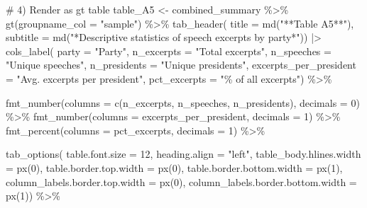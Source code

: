 \documentclass[
  man]{apa7}
\newenvironment{Shaded}{\begin{snugshade}}{\end{snugshade}}
\newcommand{\AttributeTok}[1]{\textcolor[rgb]{0.40,0.45,0.13}{#1}}
\newcommand{\CommentTok}[1]{\textcolor[rgb]{0.37,0.37,0.37}{#1}}
\newcommand{\DecValTok}[1]{\textcolor[rgb]{0.68,0.00,0.00}{#1}}
\newcommand{\FunctionTok}[1]{\textcolor[rgb]{0.28,0.35,0.67}{#1}}
\newcommand{\NormalTok}[1]{\textcolor[rgb]{0.00,0.23,0.31}{#1}}
\newcommand{\OtherTok}[1]{\textcolor[rgb]{0.00,0.23,0.31}{#1}}
\newcommand{\SpecialCharTok}[1]{\textcolor[rgb]{0.37,0.37,0.37}{#1}}
\newcommand{\StringTok}[1]{\textcolor[rgb]{0.13,0.47,0.30}{#1}}
\begin{document}
\begin{Shaded}
\begin{Highlighting}[]
\CommentTok{\# 4) Render as gt table}
\NormalTok{table\_A5 }\OtherTok{\textless{}{-}}\NormalTok{ combined\_summary }\SpecialCharTok{\%\textgreater{}\%}
  \FunctionTok{gt}\NormalTok{(}\AttributeTok{groupname\_col =} \StringTok{"sample"}\NormalTok{) }\SpecialCharTok{\%\textgreater{}\%}   
    \FunctionTok{tab\_header}\NormalTok{(}
    \AttributeTok{title =} \FunctionTok{md}\NormalTok{(}\StringTok{"**Table A5**"}\NormalTok{),   }
    \AttributeTok{subtitle =} \FunctionTok{md}\NormalTok{(}\StringTok{"*Descriptive statistics of speech excerpts by party*"}\NormalTok{)) }\SpecialCharTok{|\textgreater{}}
  \FunctionTok{cols\_label}\NormalTok{(}
    \AttributeTok{party =} \StringTok{"Party"}\NormalTok{,}
    \AttributeTok{n\_excerpts =} \StringTok{"Total excerpts"}\NormalTok{,}
    \AttributeTok{n\_speeches =} \StringTok{"Unique speeches"}\NormalTok{,}
    \AttributeTok{n\_presidents =} \StringTok{"Unique presidents"}\NormalTok{,}
    \AttributeTok{excerpts\_per\_president =} \StringTok{"Avg. excerpts per president"}\NormalTok{,}
    \AttributeTok{pct\_excerpts =} \StringTok{"\% of all excerpts"}\NormalTok{) }\SpecialCharTok{\%\textgreater{}\%}
  
  \FunctionTok{fmt\_number}\NormalTok{(}\AttributeTok{columns =} \FunctionTok{c}\NormalTok{(n\_excerpts, n\_speeches, n\_presidents), }\AttributeTok{decimals =} \DecValTok{0}\NormalTok{) }\SpecialCharTok{\%\textgreater{}\%}
  \FunctionTok{fmt\_number}\NormalTok{(}\AttributeTok{columns =}\NormalTok{ excerpts\_per\_president, }\AttributeTok{decimals =} \DecValTok{1}\NormalTok{) }\SpecialCharTok{\%\textgreater{}\%}
  \FunctionTok{fmt\_percent}\NormalTok{(}\AttributeTok{columns =}\NormalTok{ pct\_excerpts, }\AttributeTok{decimals =} \DecValTok{1}\NormalTok{) }\SpecialCharTok{\%\textgreater{}\%}
  
  \FunctionTok{tab\_options}\NormalTok{(}
    \AttributeTok{table.font.size =} \DecValTok{12}\NormalTok{,}
    \AttributeTok{heading.align =} \StringTok{"left"}\NormalTok{,    }
    \AttributeTok{table\_body.hlines.width =} \FunctionTok{px}\NormalTok{(}\DecValTok{0}\NormalTok{),}
    \AttributeTok{table.border.top.width =} \FunctionTok{px}\NormalTok{(}\DecValTok{0}\NormalTok{),}
    \AttributeTok{table.border.bottom.width =} \FunctionTok{px}\NormalTok{(}\DecValTok{1}\NormalTok{),}
    \AttributeTok{column\_labels.border.top.width =} \FunctionTok{px}\NormalTok{(}\DecValTok{0}\NormalTok{),}
    \AttributeTok{column\_labels.border.bottom.width =} \FunctionTok{px}\NormalTok{(}\DecValTok{1}\NormalTok{)) }\SpecialCharTok{\%\textgreater{}\%}
  

\end{Highlighting}
\end{Shaded}
\end{document}
